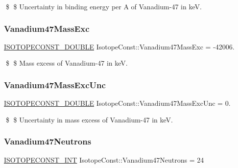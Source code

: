 \$ \$ Uncertainty in binding energy per A of Vanadium-\/47 in keV. \mbox{\label{group___isotope_const-_vanadium-_v47_gab83a3d9c4c0ebb4582991d0c20b6471b}} 
\subsubsection{\texorpdfstring{Vanadium47\+Mass\+Exc}{Vanadium47MassExc}}
{\footnotesize\ttfamily \mbox{\hyperlink{group___isotope_const-_macros_ga8f45a7272ce02c0b4c65c44636ed719a}{I\+S\+O\+T\+O\+P\+E\+C\+O\+N\+S\+T\+\_\+\+D\+O\+U\+B\+LE}} Isotope\+Const\+::\+Vanadium47\+Mass\+Exc = -\/42006.}

\$ \$ Mass excess of Vanadium-\/47 in keV. \mbox{\label{group___isotope_const-_vanadium-_v47_ga0b57f4c542f49b06d88b2388fcfd32cd}} 
\subsubsection{\texorpdfstring{Vanadium47\+Mass\+Exc\+Unc}{Vanadium47MassExcUnc}}
{\footnotesize\ttfamily \mbox{\hyperlink{group___isotope_const-_macros_ga8f45a7272ce02c0b4c65c44636ed719a}{I\+S\+O\+T\+O\+P\+E\+C\+O\+N\+S\+T\+\_\+\+D\+O\+U\+B\+LE}} Isotope\+Const\+::\+Vanadium47\+Mass\+Exc\+Unc = 0.}

\$ \$ Uncertainty in mass excess of Vanadium-\/47 in keV. \mbox{\label{group___isotope_const-_vanadium-_v47_gafc169dbab3fc61406fef180a5b519a9a}} 
\subsubsection{\texorpdfstring{Vanadium47\+Neutrons}{Vanadium47Neutrons}}
{\footnotesize\ttfamily \mbox{\hyperlink{group___isotope_const-_macros_ga5f18360b3e99483a35c32d789e62621c}{I\+S\+O\+T\+O\+P\+E\+C\+O\+N\+S\+T\+\_\+\+I\+NT}} Isotope\+Const\+::\+Vanadium47\+Neutrons = 24}

